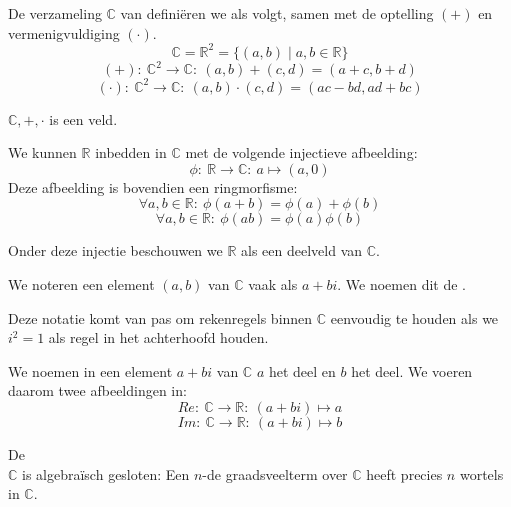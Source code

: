 \documentclass[main.tex]{subfiles}
\begin{document}
\begin{de}
  De verzameling $\mathbb{C}$ van  defini\"eren we als volgt, samen met de optelling $(+)$ en vermenigvuldiging $(\cdot)$.
  \[ \mathbb{C} = \mathbb{R}^{2} = \{ (a,b) \mid a,b\in \mathbb{R} \} \]
  \[ (+):\ \mathbb{C}^{2} \rightarrow \mathbb{C}:\ (a,b) + (c,d) = (a+c,b+d) \]
  \[ (\cdot):\ \mathbb{C}^{2} \rightarrow \mathbb{C}:\ (a,b) \cdot (c,d) = (ac-bd, ad+bc) \]
\end{de}

\begin{st}
  $\mathbb{C},+,\cdot$ is een veld.
\end{st}

\begin{pr}
  We kunnen $\mathbb{R}$ inbedden in $\mathbb{C}$ met de volgende injectieve afbeelding:
  \[ \phi:\ \mathbb{R} \rightarrow \mathbb{C}:\ a \mapsto (a,0) \]
  Deze afbeelding is bovendien een ringmorfisme:
  \[ \forall a,b \in \mathbb{R}:\ \phi(a+b) = \phi(a) + \phi(b) \]
  \[ \forall a,b \in \mathbb{R}:\ \phi(ab) = \phi(a)\phi(b) \] 
\end{pr}

\begin{opm}
  Onder deze injectie beschouwen we $\mathbb{R}$ als een deelveld van $\mathbb{C}$.
\end{opm}

\begin{de}
  We noteren een element $(a,b)$ van $\mathbb{C}$ vaak als $a+bi$.
  We noemen dit de .
\end{de}

\begin{opm}
  Deze notatie komt van pas om rekenregels binnen $\mathbb{C}$ eenvoudig te houden als we $i^{2}=1$ als regel in het achterhoofd houden. 
\end{opm}

\begin{de}
  We noemen in een element $a+bi$ van $\mathbb{C}$ $a$ het  deel en $b$ het  deel.
  We voeren daarom twee afbeeldingen in:
  \[ Re:\ \mathbb{C} \rightarrow \mathbb{R}:\ (a+bi) \mapsto a \]
  \[ Im:\ \mathbb{C} \rightarrow \mathbb{R}:\ (a+bi) \mapsto b \]
\end{de}

\begin{st}
  De \\
  $\mathbb{C}$ is algebra\"isch gesloten: Een $n$-de graadsveelterm over $\mathbb{C}$ heeft precies $n$ wortels in $\mathbb{C}$.
  \zb
\end{st}
\end{document}
